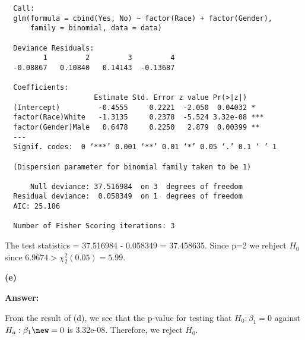 \documentclass[letterpaper,11pt]{article}
\begin{document}
\begin{lstlisting}
  Call:
  glm(formula = cbind(Yes, No) ~ factor(Race) + factor(Gender),
      family = binomial, data = data)

  Deviance Residuals:
         1         2         3         4
  -0.08867   0.10840   0.14143  -0.13687

  Coefficients:
                     Estimate Std. Error z value Pr(>|z|)
  (Intercept)         -0.4555     0.2221  -2.050  0.04032 *
  factor(Race)White   -1.3135     0.2378  -5.524 3.32e-08 ***
  factor(Gender)Male   0.6478     0.2250   2.879  0.00399 **
  ---
  Signif. codes:  0 ‘***’ 0.001 ‘**’ 0.01 ‘*’ 0.05 ‘.’ 0.1 ‘ ’ 1

  (Dispersion parameter for binomial family taken to be 1)

      Null deviance: 37.516984  on 3  degrees of freedom
  Residual deviance:  0.058349  on 1  degrees of freedom
  AIC: 25.186

  Number of Fisher Scoring iterations: 3
\end{lstlisting}

The test statistics = 37.516984 - 0.058349 = 37.458635. Since p=2 we rehject $H_0$ since $6.9674>\chi_2^2(0.05) = 5.99$.

\begin{addmargin}[-1.1em]{0em}
  \textbf{(e)}\par
\end{addmargin}
\textbf{}\par
\bigbreak
\begin{addmargin}[-0.5em]{0em}
  \textbf{Answer: }
\end{addmargin}
From the result of (d), we see that the p-value for testing that $H_0: \beta_1=0$ against $H_a:\beta_1\new=0$ is 3.32e-08. Therefore, we reject $H_0$.
\end{document}
